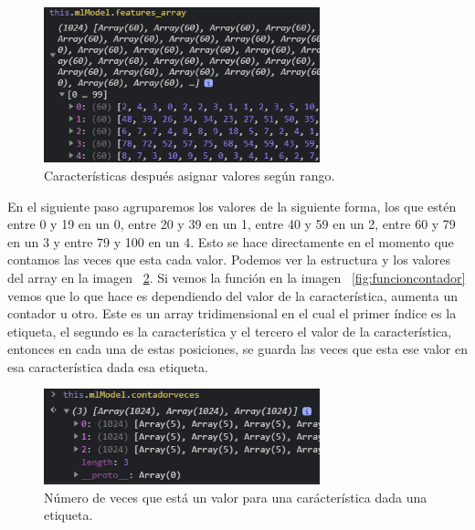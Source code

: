 \documentclass[a4paper, 12pt]{book}
\begin{document}
\begin{figure}
	\centering
	\includegraphics[width=8cm, keepaspectratio]{img/caracteristicasnormalizadas}
	\caption{Características después asignar valores según rango.}			
	\label{fig:caracteristicasnormalizadas}
\end{figure}

En el siguiente paso agruparemos los valores de la siguiente forma, los que estén entre 0 y 19 en un 0, entre 20 y 39 en un 1, entre 40 y 59 en un 2, entre 60 y 79 en un 3 y entre 79 y 100 en un 4. Esto se hace directamente en el momento que contamos las veces que esta cada valor. Podemos ver la estructura y los valores del array en la imagen ~\ref{fig:vecesvalor}. Si vemos la función en la imagen ~\ref{fig:funcioncontador} vemos que lo que hace es dependiendo del valor de la característica, aumenta un contador u otro. Este es un array tridimensional en el cual el primer índice es la etiqueta, el segundo es la característica y el tercero el valor de la característica, entonces en cada una de estas posiciones, se guarda las veces que esta ese valor en esa característica dada esa etiqueta.

\begin{figure}
	\centering
	\includegraphics[width=8cm, keepaspectratio]{img/vecesvalor}
	\caption{Número de veces que está un valor para una carácterística dada una etiqueta.}			
	\label{fig:vecesvalor}
\end{figure}
\end{document}
